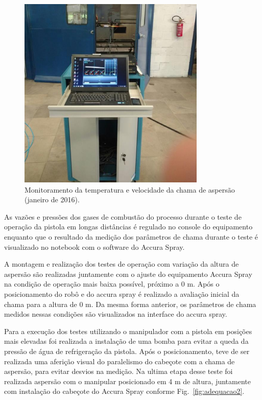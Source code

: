 \begin{figure}
	\centering
	\includegraphics[width=1\columnwidth]{method/figs/adequacao/adequacao1.png}
    \caption{Monitoramento da temperatura e velocidade da chama de aspersão
    (janeiro de 2016).}
    \label{fig:adequacao1}
\end{figure}

As vazões e pressões dos gases de combustão do processo durante o teste de
operação da pistola em longas distâncias é regulado no console do equipamento
enquanto que o resultado da medição dos parâmetros de chama durante o teste é
visualizado no notebook com o software do Accura Spray.

A montagem e realização dos testes de operação com variação da altura de
aspersão são realizadas juntamente com o ajuste do equipamento Accura Spray na
condição de operação mais baixa possível, próximo a 0 m. Após o posicionamento
do robô e do accura spray é realizado a avaliação inicial da chama para a
altura de 0 m. Da mesma forma anterior, os parâmetros de chama medidos nessas
condições são visualizados na interface do accura spray.

Para a execução dos testes utilizando o manipulador com a pistola em posições
mais elevadas foi realizada a instalação de uma bomba para evitar a queda da
pressão de água de refrigeração da pistola. Após o posicionamento, teve de ser
realizada uma aferição visual do paralelismo do cabeçote com a chama de
aspersão, para evitar desvios na medição. Na ultima etapa desse teste foi
realizada aspersão com o manipular posicionado em 4 m de altura, juntamente com
instalação do cabeçote do Accura Spray conforme Fig.~\ref{fig:adequacao2}.

